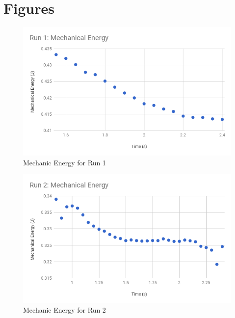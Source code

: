 \section{Figures}
\begin{figure}[ht]
    \centering
    \includegraphics[scale=0.71]{image/07-mechanic/run-1-energy.png}
    \caption{Mechanic Energy for Run 1}
    \label{figure.07.run.1.e}
\end{figure}
\begin{figure}[ht]
    \centering
    \includegraphics[scale=0.71]{image/07-mechanic/run-2-energy.png}
    \caption{Mechanic Energy for Run 2}
    \label{figure.07.run.2.e}
\end{figure}
